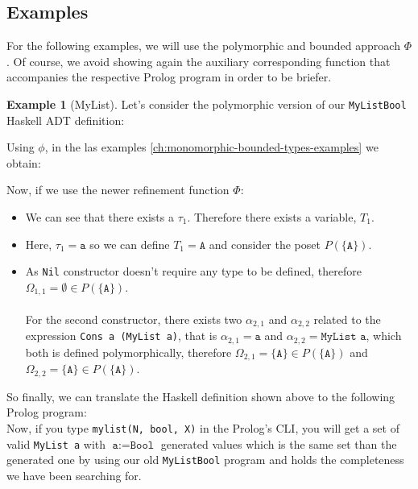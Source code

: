 \documentclass{report}
\theoremstyle{definition}
\newtheorem{example}{Example}[section]
\theoremstyle{definition}
\newcommand{\ttt}[1]{\texttt{#1}}
\begin{document}
	\subsection{Examples} \label{ch:polymorphic-types-examples}
	For the following examples, we will use the polymorphic and bounded approach $\Phi$. Of course, we avoid showing again the auxiliary corresponding function that accompanies the respective Prolog program in order to be briefer.
	\begin{example}[MyList]
		Let's consider the polymorphic version of our \ttt{MyListBool} Haskell ADT definition:
		
		Using $\phi$, in the las examples \ref{ch:monomorphic-bounded-types-examples} we obtain:
		
		Now, if we use the newer refinement function $\Phi$:
		\begin{itemize}
			\item We can see that there exists a $\tau_1$. Therefore there exists a variable, $T_1$.
			\item Here, $\tau_1 = \ttt{a}$ so we can define $T_1 = \ttt{A}$ and consider the poset $P(\{\ttt{A}\})$.
			\item As \ttt{Nil} constructor doesn't require any type to be defined, therefore $\Omega_{1,1} = \emptyset \in P(\{ \ttt{A} \})$. \\\\
			      For the second constructor, there exists two $\alpha_{2,1}$ and $\alpha_{2,2}$ related to the expression \ttt{Cons a (MyList a)}, that is $\alpha_{2,1} = \ttt{a}$ and $\alpha_{2,2} = \ttt{MyList a}$, which both is defined polymorphically, therefore $\Omega_{2,1} = \{\ttt{A}\} \in P(\{ \ttt{A} \})$ and $\Omega_{2,2} = \{\ttt{A}\} \in P(\{ \ttt{A} \})$.
		\end{itemize}
		So finally, we can translate the Haskell definition shown above to the following Prolog program:\\
		
		Now, if you type \ttt{mylist(N, bool, X)} in the Prolog's CLI, you will get a set of valid \ttt{MyList a} with $\ttt{a} := \ttt{Bool}$ generated values which is the same set than the generated one by using our old \ttt{MyListBool} program and holds the completeness we have been searching for.\\
	\end{example}
\end{document}

